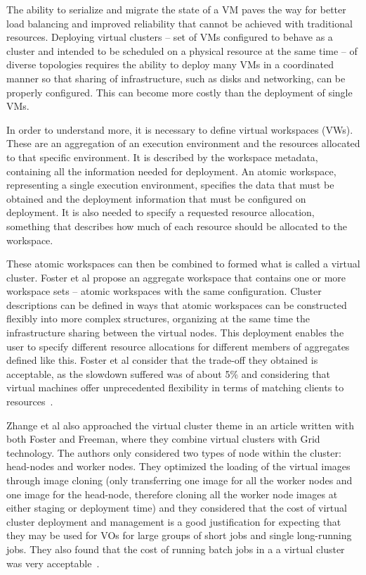 The ability to serialize and migrate the state of a VM paves the way for better load balancing and improved reliability that cannot be achieved with traditional resources. Deploying virtual clusters -- set of VMs configured to behave as a cluster and intended to be scheduled on a physical resource at the same time \cite{Zhang05virtualcluster} --  of diverse topologies requires the ability to deploy many VMs in a coordinated manner so that sharing of infrastructure, such as disks and networking, can be properly configured. This can become more costly than the deployment of single VMs.  

In order to understand more, it is necessary to define virtual workspaces (VWs). These are an aggregation of an execution environment and the resources allocated to that specific environment. It is described by the workspace metadata, containing all the information needed for deployment. An atomic workspace, representing a single execution environment, specifies the data that must be obtained and the deployment information that must be configured on deployment. It is also needed to specify a requested resource allocation, something that describes how much of each resource should be allocated to the workspace.

These atomic workspaces can then be combined to formed what is called a virtual cluster. Foster et al propose an aggregate workspace that contains one or more workspace sets -- atomic workspaces with the same configuration. Cluster descriptions can be defined in ways that atomic workspaces can be constructed flexibly into more complex structures, organizing at the same time the infrastructure sharing between the virtual nodes. This deployment enables the user to specify different resource allocations for different members of aggregates defined like this. Foster et al consider that the trade-off they obtained is acceptable, as the slowdown suffered was of about 5\% and considering that virtual machines offer unprecedented flexibility in terms of matching clients to resources~\cite{clusters-grid}.

Zhange et al also approached the virtual cluster theme in an article written with both Foster and Freeman, where they combine virtual clusters with Grid technology. The authors only considered two types of node within the cluster: head-nodes and worker nodes. They optimized the loading of the virtual images through image cloning (only transferring one image for all the worker nodes and one image for the head-node, therefore cloning all the worker node images at either staging or deployment time) and they considered that the cost of virtual cluster deployment and management is a good justification for expecting that they may be used for VOs for large groups of short jobs and single long-running jobs. They also found that the cost of running batch jobs in a a virtual cluster was very acceptable~\cite{Zhang05virtualcluster}.


